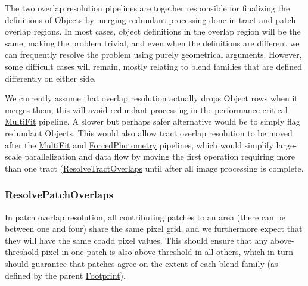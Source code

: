 The two overlap resolution pipelines are together responsible for finalizing the definitions of Objects by merging redundant processing done in tract and patch overlap regions.  In most cases, object definitions in the overlap region will be the same, making the problem trivial, and even when the definitions are different we can frequently resolve the problem using purely geometrical arguments.  However, some difficult cases will remain, mostly relating to blend families that are defined differently on either side.

We currently assume that overlap resolution actually drops Object rows when it merges them; this will avoid redundant processing in the performance critical \hyperref[sec:drpMultiFit]{MultiFit} pipeline.  A slower but perhaps safer alternative would be to simply flag redundant Objects.  This would also allow tract overlap resolution to be moved after the \hyperref[sec:drpMultiFit]{MultiFit} and \hyperref[sec:drpForcedPhotometry]{ForcedPhotometry} pipelines, which would simplify large-scale parallelization and data flow by moving the first operation requiring more than one tract (\hyperref[sec:drpResolveTractOverlaps]{ResolveTractOverlaps} until after all image processing is complete.

\subsubsection{ResolvePatchOverlaps}
\label{sec:drpResolvePatchOverlaps}

In patch overlap resolution, all contributing patches to an area (there can be between one and four) share the same pixel grid, and we furthermore expect that they will have the same coadd pixel values.  This should ensure that any above-threshold pixel in one patch is also above threshold in all others, which in turn should guarantee that patches agree on the extent of each blend family (as defined by the parent \hyperref[sec:spFootprints]{Footprint}).

